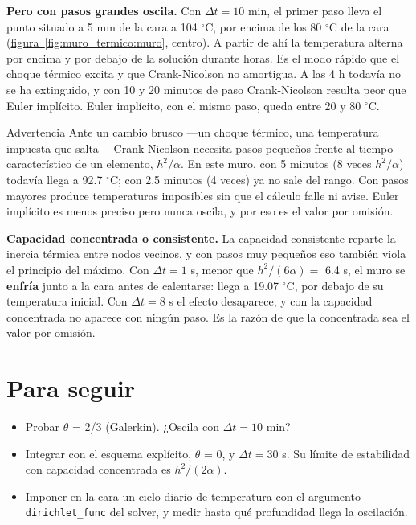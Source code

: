 \documentclass[11pt,oneside]{report}
\begin{document}
\textbf{Pero con pasos grandes oscila.} Con $\Delta t = 10$ min, el primer paso lleva el punto situado a 5 mm de la cara a 104 \ensuremath{^{\circ}}C, por encima de los 80 \ensuremath{^{\circ}}C de la cara (\hyperref[fig:muro_termico:muro]{figura~\ref*{fig:muro_termico:muro}}, centro). A partir de ahí la temperatura alterna por encima y por debajo de la solución durante horas. Es el modo rápido que el choque térmico excita y que Crank-Nicolson no amortigua. A las 4 h todavía no se ha extinguido, y con 10 y 20 minutos de paso Crank-Nicolson resulta peor que Euler implícito. Euler implícito, con el mismo paso, queda entre 20 y 80 \ensuremath{^{\circ}}C.

\begin{warnbox}{Advertencia}
Ante un cambio brusco ---un choque térmico, una temperatura impuesta que salta--- Crank-Nicolson necesita pasos pequeños frente al tiempo característico de un elemento, $h^2/\alpha$. En este muro, con 5 minutos (8 veces $h^2/\alpha$) todavía llega a 92.7 \ensuremath{^{\circ}}C; con 2.5 minutos (4 veces) ya no sale del rango. Con pasos mayores produce temperaturas imposibles sin que el cálculo falle ni avise. Euler implícito es menos preciso pero nunca oscila, y por eso es el valor por omisión.
\end{warnbox}

\textbf{Capacidad concentrada o consistente.} La capacidad consistente reparte la inercia térmica entre nodos vecinos, y con pasos muy pequeños eso también viola el principio del máximo. Con $\Delta t = 1$ s, menor que $h^2/(6\alpha) =$ 6.4 s, el muro se \textbf{enfría} junto a la cara antes de calentarse: llega a 19.07 \ensuremath{^{\circ}}C, por debajo de su temperatura inicial. Con $\Delta t = 8$ s el efecto desaparece, y con la capacidad concentrada no aparece con ningún paso. Es la razón de que la concentrada sea el valor por omisión.

\section{Para seguir}

\begin{itemize}
  \item Probar \ensuremath{\theta} = 2/3 (Galerkin). ¿Oscila con $\Delta t = 10$ min?
  \item Integrar con el esquema explícito, \ensuremath{\theta} = 0, y $\Delta t = 30$ s. Su límite de estabilidad con capacidad concentrada es $h^2/(2\alpha)$.
  \item Imponer en la cara un ciclo diario de temperatura con el argumento \texttt{dirichlet\_func} del solver, y medir hasta qué profundidad llega la oscilación.
\end{itemize}
\end{document}
